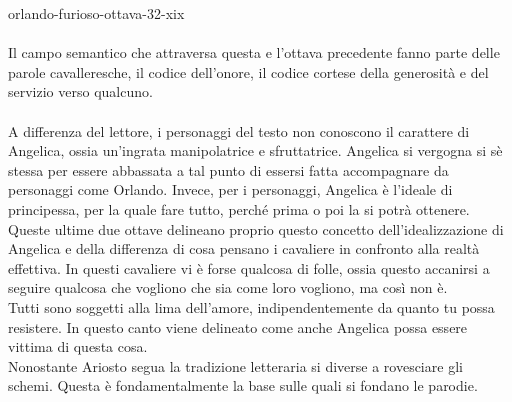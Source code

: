 \documentclass[preview]{standalone}
\begin{document}
\begin{snippet}{orlando-furioso-ottava-32-xix}
    \\\\
    Il campo semantico che attraversa questa e l'ottava precedente fanno
    parte delle parole cavalleresche, il codice dell'onore, il codice cortese
    della generosità e del servizio verso qualcuno.
    \\\\
    A differenza del lettore, i personaggi del testo non conoscono il carattere di Angelica,
    ossia un'ingrata manipolatrice e sfruttatrice.
    Angelica si vergogna si sè stessa per essere abbassata a tal punto di essersi fatta accompagnare
    da personaggi come Orlando.
    Invece, per i personaggi, Angelica è l'ideale di principessa, per la quale fare tutto,
    perché prima o poi la si potrà ottenere.
    Queste ultime due ottave delineano proprio questo concetto dell'idealizzazione di Angelica
    e della differenza di cosa pensano i cavaliere in confronto alla realtà effettiva.
    In questi cavaliere vi è forse qualcosa di folle, ossia questo accanirsi a seguire qualcosa
    che vogliono che sia come loro vogliono, ma così non è.
    \\
    Tutti sono soggetti alla lima dell'amore, indipendentemente da quanto tu possa resistere.
    In questo canto viene delineato come anche Angelica possa essere vittima di questa cosa.
    \\
    Nonostante Ariosto segua la tradizione letteraria si diverse a rovesciare gli schemi.
    Questa è fondamentalmente la base sulle quali si fondano le parodie.
\end{snippet}
\end{document}
